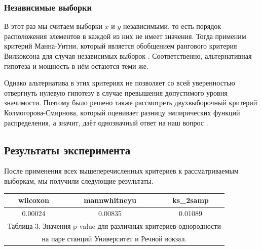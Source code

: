 \documentclass[12pt, fleqn, titlepage]{article}
\begin{document}
    \subsubsection{Независимые выборки}

    В этот раз мы считаем выборки $x$ и $y$ независимыми, то есть порядок расположения элементов в 
    каждой из них не имеет значения. Тогда применим критерий Манна-Уитни, который является обобщением 
    рангового критерия Вилкоксона для случая независимых выборок \cite{mannwhitneyu}. Соответственно, альтернативная гипотеза 
    и мощность в нём остаются теми же.
    
    Однако альтернатива в этих критериях не позволяет со всей уверенностью отвергнуть нулевую гипотезу 
    в случае превышения допустимого уровня значимости. Поэтому было решено также рассмотреть двухвыборочный 
    критерий Колмогорова-Смирнова, который оценивает разницу эмпирических функций распределения, а значит, 
    даёт однозначный ответ на наш вопрос \cite{ks_2samp}.

    \subsection{Результаты эксперимента}

    После применения всех вышеперечисленных критериев к рассматриваемым выборкам, мы получили следующие результаты.

    \begin{center}
    \begin{tabular}{ |c|c|c| } 
        
        \hline
        wilcoxon & mannwhitneyu & ks\_2samp \\
        \hline
        0.00024 & 0.00835 & 0.01089 \\
        \hline
        \multicolumn{3}{c}{\footnotesize Таблица 3.
        Значения p-value для различных критериев однородности} \\
        \multicolumn{3}{c}{\footnotesize 
        на паре станций Университет и Речной вокзал.} \\
        
    \end{tabular}
    \end{center}
\end{document}
